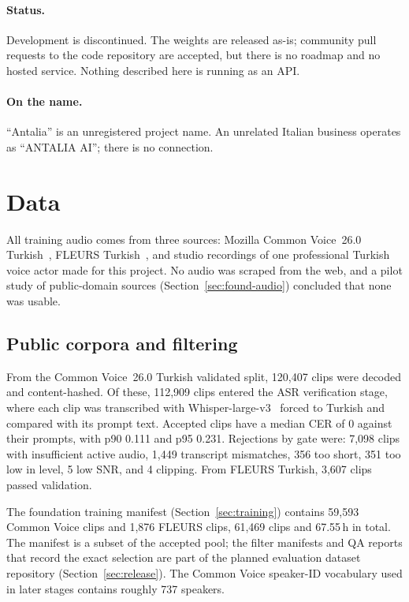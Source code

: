 \documentclass[10pt,twocolumn]{article}
\begin{document}
\paragraph{Status.} Development is discontinued. The weights are released as-is; community pull requests to the code repository are accepted, but there is no roadmap and no hosted service. Nothing described here is running as an API.

\paragraph{On the name.} ``Antalia'' is an unregistered project name. An unrelated Italian business operates as ``ANTALIA AI''; there is no connection.

\section{Data}
\label{sec:data}

All training audio comes from three sources: Mozilla Common Voice~26.0 Turkish~\citep{ardila2020commonvoice}, FLEURS Turkish~\citep{conneau2023fleurs}, and studio recordings of one professional Turkish voice actor made for this project. No audio was scraped from the web, and a pilot study of public-domain sources (Section~\ref{sec:found-audio}) concluded that none was usable.

\subsection{Public corpora and filtering}
\label{sec:public-data}

From the Common Voice~26.0 Turkish validated split, 120,407 clips were decoded and content-hashed. Of these, 112,909 clips entered the ASR verification stage, where each clip was transcribed with Whisper-large-v3~\citep{radford2023whisper} forced to Turkish and compared with its prompt text. Accepted clips have a median CER of 0 against their prompts, with p90 0.111 and p95 0.231. Rejections by gate were: 7,098 clips with insufficient active audio, 1,449 transcript mismatches, 356 too short, 351 too low in level, 5 low SNR, and 4 clipping. From FLEURS Turkish, 3,607 clips passed validation.

The foundation training manifest (Section~\ref{sec:training}) contains 59,593 Common Voice clips and 1,876 FLEURS clips, 61,469 clips and 67.55\,h in total. The manifest is a subset of the accepted pool; the filter manifests and QA reports that record the exact selection are part of the planned evaluation dataset repository (Section~\ref{sec:release}). The Common Voice speaker-ID vocabulary used in later stages contains roughly 737 speakers.
\end{document}
